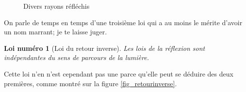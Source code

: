 \documentclass[a4paper,12pt]{book}
\newcommand{\pstTransHom}[5]{%
\pstTranslation{#1}{#2}{#3}[inter]
\pstHomO[HomCoef=#4]{#3}{inter}[#5]
}
\newcommand{\pstDecompForce}[8]{%
  \psset{PointSymbol=none, PointName=none}
\pstTranslation{#3}{#4}{#1}[ibBu]
\pstTranslation{#5}{#6}{#1}[ibBd]

\pstTranslation{#3}{#4}{#2}[jbBu]
\pstTranslation{#5}{#6}{#2}[jbBd]

\pstInterLL{#2}{jbBd}{#1}{ibBu}{#7}
\pstInterLL{#2}{jbBu}{#1}{ibBd}{#8}
}
\newcommand{\pstDioptre}[8][Diinter]{%
  \psset{PointSymbol=none, PointName=none}
	\pstGeonode(#2){DiO}(#3){DiP}(#4){DiRi}
	\pstRotation[RotAngle=90]{DiO}{DiP}[DiQ]				%
   	\pstDecompForce{DiO}{DiRi}{DiO}{DiP}{DiO}{DiQ}{DiRix}{DiRiy}		%
  \FPeval{Dicoefrel}{#5/#6}
	\pstTransHom{DiRi}{DiRiy}{DiO}{\Dicoefrel}{DiRex}			%

   	\pstTranslation{DiO}{DiRex}{DiQ}[DiR]
   	\pstInterLC{DiRex}{DiR}{DiO}{DiRi}{#8}{#1}				%

	\pstTranslation{DiRi}{DiRiy}{DiRiy}[#7]					%
}
\newcounter{numloiphyz}
\theoremstyle{mes_exemples}	\newtheorem{exemple}[numtho]{Exemple}
\theoremstyle{mes_tho}
\newtheorem{loiphyz}[numloiphyz]{Loi numéro}
\begin{document}
\begin{figure}[ht]
\centering

%
%
%
%
%
%
\caption{Divers rayons réfléchis}\label{fig_reflexion}
\end{figure}


On parle de temps en temps d'une troisième loi qui a au moins le mérite d'avoir un nom marrant; je te laisse juger. 

\begin{loiphyz}[Loi du retour inverse]
Les lois de la réflexion sont indépendantes du sens de parcours de la lumière.
\end{loiphyz}
 
Cette loi n'en n'est cependant pas une parce qu'elle peut se déduire des deux premières, comme montré sur la figure \ref{fig_retourinverse}.

\newcommand{\prefigretourinverse}{%
			
\pstGeonode(0,0){O}(2,0){P}
\pstRotation[RotAngle=90]{O}{P}[Qi]
\pstHomO[HomCoef=0.5]{O}{Qi}[Q]
\pstRotation[RotAngle=180]{O}{P}[R]
\pstHomO[HomCoef=-1]{O}{Q}[S]
\pstRotation[RotAngle=-40]{O}{R}[Ri]		%
    \pstDioptre{O}{P}{Ri}{0.9}{2}{Rs}{Re}	%
}
\end{document}
